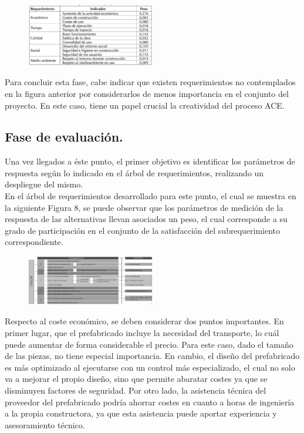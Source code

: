 \documentclass[10pt]{article}
\begin{document}
\begin{figure}[H]
	\begin{center}
 		\includegraphics[width = 0.5\textwidth]{Imagenes/img3.eps}
	\end{center} 
\end{figure}

Para concluir esta fase, cabe indicar que existen requerimientos no contemplados en la figura anterior por considerarlos de menos importancia en el conjunto del proyecto. En este caso, tiene un papel crucial la creatividad del proceso ACE.

\subsection{Fase de evaluación.}

Una vez llegados a éste punto, el primer objetivo es identificar los parámetros de respuesta según lo indicado en el árbol de requerimientos, realizando un despliegue del mismo.\\

En el árbol de requerimientos desarrollado para este punto, el cual se muestra en la siguiente Figura 8, se puede observar que los parámetros de medición de la respuesta de las alternativas llevan asociados un peso, el cual corresponde a su grado de participación en el conjunto de la satisfacción del subrequerimiento correspondiente.

\begin{figure}[H]
	\begin{center}
 		\includegraphics[width = 0.5\textwidth]{Imagenes/img4.eps}
	\end{center} 
\end{figure}

Respecto al coste económico, se deben considerar dos puntos importantes. En primer lugar, que el prefabricado incluye la necesidad del transporte, lo cuál puede aumentar de forma considerable el precio. Para este caso, dado el tamaño de las piezas, no tiene especial importancia. En cambio, el diseño del prefabricado es más optimizado al ejecutarse con un control más especializado, el cual no solo va a mejorar el propio diseño, sino que permite abaratar costes ya que se disminuyen factores de seguridad. Por otro lado, la asistencia técnica del proveedor del prefabricado podría ahorrar costes en cuanto a horas de ingeniería a la propia constructora, ya que esta asistencia puede aportar experiencia y asesoramiento técnico.\\
\end{document}
